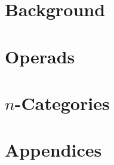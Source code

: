 \documentclass{book}
\begin{document}

\tableofcontents


\frontmatter







\mainmatter

\part{Background}	
\label{part:background}

	



\part{Operads}
\label{part:operads}






\part{$n$-Categories}
\label{part:n-categories}






\part*{Appendices}

\appendix











\backmatter




\small
{}
\printindex
\end{document}

